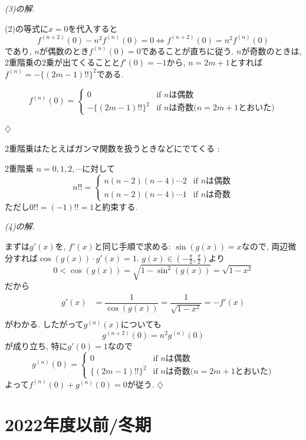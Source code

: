 \documentclass[titlepage]{jsarticle}
\numberwithin{equation}{section}
\newenvironment{kaitou}[1][解]{%
\begin{proofbox}%
\textit{#1. }\ignorespaces
}{%
\hfill$\diamondsuit$%
\end{proofbox}%
}
\begin{document}
\begin{kaitou}[(3)の解]
(2)の等式に$x=0$を代入すると
\[
f^{(n+2)}(0) - n^2f^{(n)}(0) = 0 \iff f^{(n+2)}(0) = n^2f^{(n)}(0)
\]
であり, $n$が偶数のとき$f^{(n)}(0) = 0$であることが直ちに従う. $n$が奇数のときは, 2重階乗の2乗が出てくることと$f'(0) = -1$から, $n=2m+1$とすれば$f^{(n)} = -\{(2m-1)!!\}^2$である.
\begin{answerbox}
\[
f^{(n)}(0) = 
\begin{cases}
 0 & \text{if $n$は偶数}\\
 -\{(2m-1)!!\}^2 & \text{if $n$は奇数\.($n=2m+1$とおいた)}
\end{cases}
\]
\end{answerbox}
\end{kaitou}
2重階乗はたとえばガンマ関数を扱うときなどにでてくる :
\begin{dfn}{2重階乗}{}
$n=0,1,2,\cdots$に対して
\[
n!!
=
\begin{cases}
n(n-2)(n-4)\cdots 2 & \text{if $n$は偶数}\\
n(n-2)(n-4)\cdots 1 & \text{if $n$は奇数}
\end{cases}
\]
ただし$0!! = (-1)!! = 1$と約束する.
\end{dfn}
\begin{kaitou}[(4)の解]
まずは$g'(x)$を, $f'(x)$と同じ手順で求める: $\sin(g(x))=x$なので, 両辺微分すれば$\cos(g(x))\cdot g'(x) = 1$. $g(x) \in (-\frac{\pi}{2}, \frac{\pi}{2})$より
\[
0 < \cos(g(x)) = \sqrt{1 - \sin^2(g(x))} = \sqrt{1 - x^2}
\]
だから
\begin{align*}
g'(x) &= \dfrac{1}{\cos(g(x))} = \dfrac{1}{\sqrt{1 - x^2}} = -f'(x)\\
\end{align*}
がわかる. したがって$g^{(n)}(x)$についても
\[
g^{(n+2)}(0) = n^2g^{(n)}(0)
\]
が成り立ち, 特に$g'(0) = 1$なので
\[
g^{(n)}(0) = 
\begin{cases}
 0 & \text{if $n$は偶数}\\
 \{(2m-1)!!\}^2 & \text{if $n$は奇数\.($n=2m+1$とおいた)}
\end{cases}
\]
よって$f^{(n)}(0)+g^{(n)}(0)=0$が従う.
\end{kaitou}
\section{2022年度以前/冬期}
\end{document}
